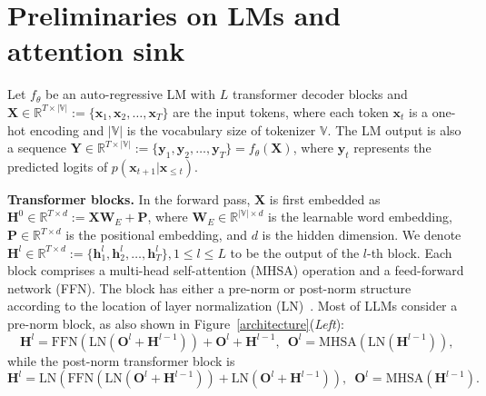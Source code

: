 

\vspace{-0.25cm}
\section{Preliminaries on LMs and attention sink}
\vspace{-0.15cm}


Let $f_{\theta}$ be an auto-regressive LM with $L$ transformer decoder blocks and $\boldsymbol{X}\in \mathbb{R}^{T \times |\mathbb{V}|}:=\{\boldsymbol{x}_1\textrm{,}\,\boldsymbol{x}_2\textrm{,}\,\ldots\textrm{,}\,\boldsymbol{x}_T\}$ are the input tokens, where each token $\boldsymbol{x}_t$ is a one-hot encoding and $|\mathbb{V}|$ is the vocabulary size of tokenizer $\mathbb{V}$. The LM output is also a sequence $\boldsymbol{Y}\in \mathbb{R}^{T \times |\mathbb{V}|}:=\{\boldsymbol{y}_1\textrm{,}\, \boldsymbol{y}_2\textrm{,}\,\ldots\textrm{,}\, \boldsymbol{y}_T\}=f_{\theta}(\boldsymbol{X})$, where $\boldsymbol{y}_t$ represents the predicted logits of $p(\boldsymbol{x}_{t+1}|\boldsymbol{x}_{\leq t})$. 


\textbf{Transformer blocks.} In the forward pass, $\boldsymbol{X}$ is first embedded as $\boldsymbol{H}^{0} \in\mathbb{R}^{T\times d}:=\boldsymbol{X}\boldsymbol{W}_{E}+\boldsymbol{P}$,  where $\boldsymbol{W}_{E}\in \mathbb{R}^{|\mathbb{V}|\times d}$ is the learnable word embedding, $\boldsymbol{P}\in\mathbb{R}^{T\times d}$ is the positional embedding, and $d$ is the hidden dimension. We denote $\boldsymbol{H}^{l}\in \mathbb{R}^{T\times d}:=\{\boldsymbol{h}_1^{l}\textrm{,}\,\boldsymbol{h}_2^{l}\textrm{,}\,\ldots\textrm{,}\,\boldsymbol{h}_T^{l}\}\textrm{,}\,1\leq l\leq L$ to be the output of the $l$-th block. Each block comprises a multi-head self-attention (MHSA) operation and a feed-forward network (FFN). The block has either a pre-norm or post-norm structure according to the location of layer normalization (LN)~\citep{ba2016layernormalization,zhang2019root}. Most of LLMs consider a pre-norm block, as also shown in Figure~\ref{architecture}(\emph{Left}):
\begin{equation}\label{eq-pre-norm}
    \boldsymbol{H}^{l}=\textrm{FFN}(\textrm{LN}(\boldsymbol{O}^l + \boldsymbol{H}^{l-1})) +  \boldsymbol{O}^l + \boldsymbol{H}^{l-1}\textrm{,}\,\,\,\,\boldsymbol{O}^l=\textrm{MHSA}(\textrm{LN}(\boldsymbol{H}^{l-1}))\textrm{,}
\end{equation}
while the post-norm transformer block is
\begin{equation}
\boldsymbol{H}^{l}=\textrm{LN}\left(\textrm{FFN}(\textrm{LN}(\boldsymbol{O}^l + \boldsymbol{H}^{l-1})) + \textrm{LN}(\boldsymbol{O}^l + \boldsymbol{H}^{l-1})\right)\textrm{,}\,\,\,\,\boldsymbol{O}^l=\textrm{MHSA}(\boldsymbol{H}^{l-1})\textrm{.}
\end{equation}


